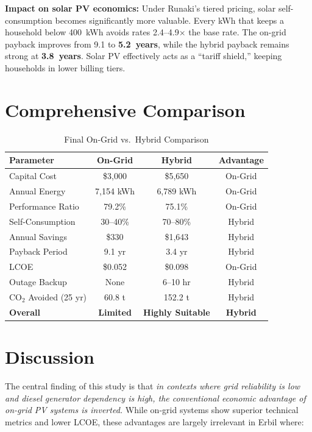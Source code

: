 \textbf{Impact on solar PV economics:} Under Runaki's tiered pricing, solar self-consumption becomes significantly more valuable. Every kWh that keeps a household below 400~kWh avoids rates 2.4--4.9$\times$ the base rate. The on-grid payback improves from 9.1 to \textbf{5.2~years}, while the hybrid payback remains strong at \textbf{3.8~years}. Solar PV effectively acts as a ``tariff shield,'' keeping households in lower billing tiers.


\section{Comprehensive Comparison}

\begin{table}[H]
\centering
\caption{Final On-Grid vs.\ Hybrid Comparison}
\label{tab:short_final}
\small
\begin{tabular}{@{}p{4.5cm} c c c@{}}
\toprule
\textbf{Parameter} & \textbf{On-Grid} & \textbf{Hybrid} & \textbf{Advantage} \\
\midrule
Capital Cost & \$3,000 & \$5,650 & On-Grid \\
Annual Energy & 7,154 kWh & 6,789 kWh & On-Grid \\
Performance Ratio & 79.2\% & 75.1\% & On-Grid \\
Self-Consumption & 30--40\% & 70--80\% & Hybrid \\
Annual Savings & \$330 & \$1,643 & Hybrid \\
Payback Period & 9.1 yr & 3.4 yr & Hybrid \\
LCOE & \$0.052 & \$0.098 & On-Grid \\
Outage Backup & None & 6--10 hr & Hybrid \\
CO$_2$ Avoided (25 yr) & 60.8 t & 152.2 t & Hybrid \\
\textbf{Overall} & \textbf{Limited} & \textbf{Highly Suitable} & \textbf{Hybrid} \\
\bottomrule
\end{tabular}
\end{table}


\section{Discussion}

The central finding of this study is that \textit{in contexts where grid reliability is low and diesel generator dependency is high, the conventional economic advantage of on-grid PV systems is inverted.} While on-grid systems show superior technical metrics and lower LCOE, these advantages are largely irrelevant in Erbil where:

